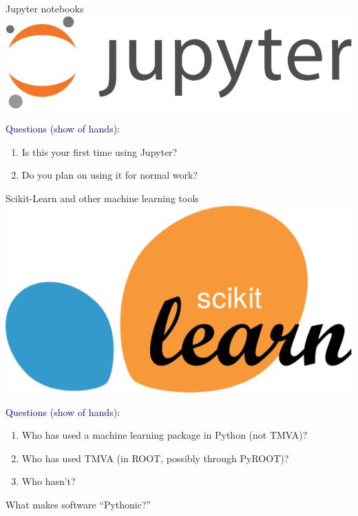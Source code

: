 \documentclass[aspectratio=169]{beamer}
\begin{document}
\begin{frame}{Jupyter notebooks}
\vspace{0.25 cm}
\hfill \includegraphics[height=0.8 cm]{jupyter-logo.png}

\vspace{-0.8 cm}

\vfill
\small
\textcolor{darkblue}{Questions (show of hands):}
\vspace{-0.2 cm}
\begin{enumerate}\setlength{\itemsep}{-0.1 cm}
\item Is this your first time using Jupyter?
\item Do you plan on using it for normal work?
\end{enumerate}
\end{frame}

\begin{frame}{Scikit-Learn and other machine learning tools}
\vspace{0.25 cm}
\hfill \includegraphics[height=1.1 cm]{sklearn-logo.png}

\vspace{-1.1 cm}

\vfill
\small
\textcolor{darkblue}{Questions (show of hands):}
\vspace{-0.2 cm}
\begin{enumerate}\setlength{\itemsep}{-0.1 cm}
\item Who has used a machine learning package in Python (not TMVA)?
\item Who has used TMVA (in ROOT, possibly through PyROOT)?
\item Who hasn't?
\end{enumerate}
\end{frame}

\begin{frame}{What makes software ``Pythonic?''}
\end{frame}
\end{document}

